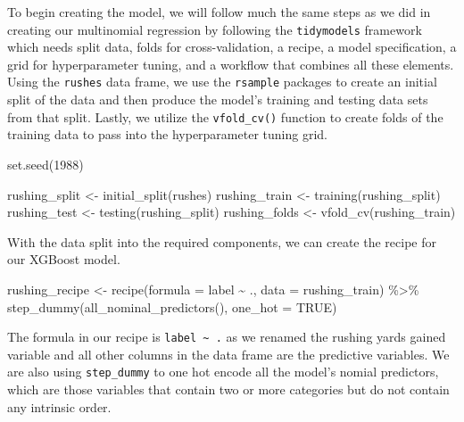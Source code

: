 \documentclass[
  letterpaper,
]{krantz}
\newenvironment{Shaded}{\begin{snugshade}}{\end{snugshade}}
\newcommand{\AttributeTok}[1]{\textcolor[rgb]{0.40,0.45,0.13}{#1}}
\newcommand{\ConstantTok}[1]{\textcolor[rgb]{0.56,0.35,0.01}{#1}}
\newcommand{\DecValTok}[1]{\textcolor[rgb]{0.68,0.00,0.00}{#1}}
\newcommand{\FunctionTok}[1]{\textcolor[rgb]{0.28,0.35,0.67}{#1}}
\newcommand{\NormalTok}[1]{\textcolor[rgb]{0.00,0.23,0.31}{#1}}
\newcommand{\OtherTok}[1]{\textcolor[rgb]{0.00,0.23,0.31}{#1}}
\newcommand{\SpecialCharTok}[1]{\textcolor[rgb]{0.37,0.37,0.37}{#1}}
\begin{document}
To begin creating the model, we will follow much the same steps as we
did in creating our multinomial regression by following the
\texttt{tidymodels} framework which needs split data, folds for
cross-validation, a recipe, a model specification, a grid for
hyperparameter tuning, and a workflow that combines all these elements.
Using the \texttt{rushes} data frame, we use the \texttt{rsample}
packages to create an initial split of the data and then produce the
model's training and testing data sets from that split. Lastly, we
utilize the \texttt{vfold\_cv()} function to create folds of the
training data to pass into the hyperparameter tuning grid.

\begin{Shaded}
\begin{Highlighting}[]
\FunctionTok{set.seed}\NormalTok{(}\DecValTok{1988}\NormalTok{)}

\NormalTok{rushing\_split }\OtherTok{\textless{}{-}} \FunctionTok{initial\_split}\NormalTok{(rushes)}
\NormalTok{rushing\_train }\OtherTok{\textless{}{-}} \FunctionTok{training}\NormalTok{(rushing\_split)}
\NormalTok{rushing\_test }\OtherTok{\textless{}{-}} \FunctionTok{testing}\NormalTok{(rushing\_split)}
\NormalTok{rushing\_folds }\OtherTok{\textless{}{-}} \FunctionTok{vfold\_cv}\NormalTok{(rushing\_train)}
\end{Highlighting}
\end{Shaded}

With the data split into the required components, we can create the
recipe for our XGBoost model.

\begin{Shaded}
\begin{Highlighting}[]
\NormalTok{rushing\_recipe }\OtherTok{\textless{}{-}}
  \FunctionTok{recipe}\NormalTok{(}\AttributeTok{formula =}\NormalTok{ label }\SpecialCharTok{\textasciitilde{}}\NormalTok{ ., }\AttributeTok{data =}\NormalTok{ rushing\_train) }\SpecialCharTok{\%\textgreater{}\%}
  \FunctionTok{step\_dummy}\NormalTok{(}\FunctionTok{all\_nominal\_predictors}\NormalTok{(), }\AttributeTok{one\_hot =} \ConstantTok{TRUE}\NormalTok{)}
\end{Highlighting}
\end{Shaded}

The formula in our recipe is \texttt{label\ \textasciitilde{}\ .} as we
renamed the rushing yards gained variable and all other columns in the
data frame are the predictive variables. We are also using
\texttt{step\_dummy} to one hot encode all the model's nomial
predictors, which are those variables that contain two or more
categories but do not contain any intrinsic order.
\end{document}
